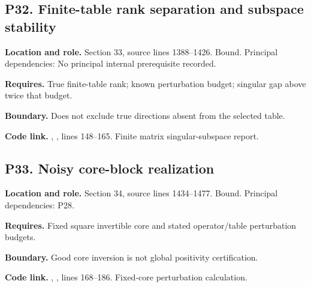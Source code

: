 \documentclass[11pt,oneside,openany]{book}
\numberwithin{equation}{section}
\begin{document}
\par\noindent\begin{minipage}{\textwidth}
\subsection{P32. Finite-table rank separation and subspace
stability}\label{LSMRegister:p32.-finite-table-rank-separation-and-subspace-stability}

\textbf{Location and role.} Section 33, source lines 1388--1426. Bound.
Principal dependencies: No principal internal prerequisite recorded.

\textbf{Requires.} True finite-table rank; known perturbation budget;
singular gap above twice that budget.

\textbf{Boundary.} Does not exclude true directions absent from the
selected table.

\textbf{Code link.} ,
, lines 148--165. Finite matrix
singular-subspace report.
\end{minipage}\par\medskip

\par\noindent\begin{minipage}{\textwidth}
\subsection{P33. Noisy core-block
realization}\label{LSMRegister:p33.-noisy-core-block-realization}

\textbf{Location and role.} Section 34, source lines 1434--1477. Bound.
Principal dependencies: P28.

\textbf{Requires.} Fixed square invertible core and stated
operator/table perturbation budgets.

\textbf{Boundary.} Good core inversion is not global positivity
certification.

\textbf{Code link.} ,
, lines 168--186. Fixed-core perturbation
calculation.
\end{minipage}\par\medskip
\end{document}
